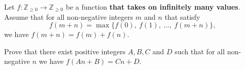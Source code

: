 Let $f\colon \mathbb{Z}_{\geq 0} \to \mathbb{Z}_{\geq 0}$ be a function
\textbf{that takes on infinitely many values}.
Assume that for all non-negative integers $m$ and $n$ that satisfy
\[
    f(m+n) = \max\Big\lbrace f(0),\  f(1),\ \dots,\  f(m+n)\Big\rbrace,
\]
we have $f(m+n) = f(m) + f(n)$.

Prove that there exist positive integers $A,B,C$ and $D$ such that
for all non-negative $n$ we have $f(An+B) = Cn+D$.

